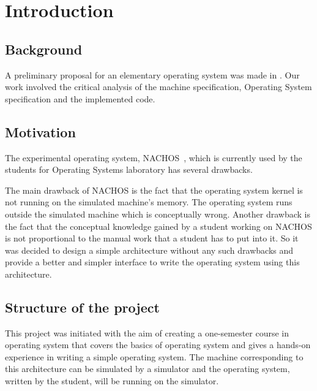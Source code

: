 \chapter{Introduction}

\section{Background}
\label{background}
A preliminary proposal for an elementary operating system was made in \cite{group1,group2}.
Our work involved the critical analysis of the machine specification, Operating System specification and the implemented code.

\section{Motivation}
\label{motivation}
The experimental operating system, NACHOS~\cite{nachos}, which is currently used by the students for Operating Systems laboratory has several drawbacks.

The main drawback of NACHOS is the fact that the operating system kernel is not running on the simulated machine's memory. The operating system runs outside the simulated machine which is conceptually wrong.
Another drawback is the fact that the conceptual knowledge gained by a student working on NACHOS is not proportional to the manual work that a student has to put into it.
So it was decided to design a simple architecture without any such drawbacks and provide a better and simpler interface to write the operating system using this architecture.

\section{Structure of the project}
This project was initiated with the aim of creating a one-semester course in operating system that covers the basics of operating system and gives a hands-on experience in writing a simple operating system.	The machine corresponding to this architecture can be simulated by a simulator and the operating system, written by the student, will be running on the simulator. 

